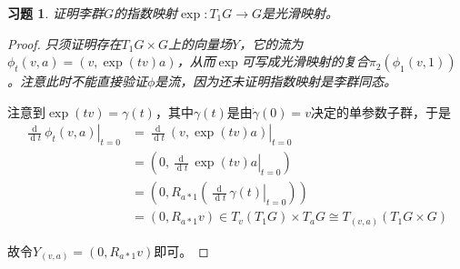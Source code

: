 \documentclass[winfonts,UTF8,c5size,a4paper,fancyhdr,hyperref,titlepage,nocap]{ctexart}
\newtheorem{xiti}{习题}
\theoremstyle{definition}
\theoremstyle{remark}
\numberwithin{equation}{subsection}
\newcommand{\dt}{\frac{\operatorname{d}}{\operatorname{d}t}}
\newcommand{\local}[2]{\left.{#1}\right|_{#2}}%
\newcommand{\localt}[1]{\local{#1}{t=0}}%
\begin{document}
\begin{xiti}
  证明李群$G$的指数映射$\exp\colon T_1G\to G$是光滑映射。
\end{xiti}
\begin{proof}
  \emph{只须证明存在$T_1G\times G$上的向量场$Y$，它的流为$\phi_t(v,a)=(v,\exp(tv)a)$，从而$\exp$可写成光滑映射的复合$\pi_2(\phi_1(v,1))$。注意此时不能直接验证$\phi$是流，因为还未证明指数映射是李群同态。}

  注意到$\exp(tv)=\gamma(t)$，其中$\gamma(t)$是由$\dot{\gamma}(0)=v$决定的单参数子群，于是
  \begin{align*}
    \localt{\dt\phi_t(v,a)}&=\localt{\dt(v,\exp(tv)a)}\\
                                   &=(0,\localt{\dt\exp(tv)a})\\
                                   &=(0,R_{a\ast1}(\localt{\dt\gamma(t)}))\\
                                   &=(0,R_{a\ast1}v)\in T_v(T_1G)\times T_aG\cong T_{(v,a)}(T_1G\times G)
  \end{align*}

  故令$Y_{(v,a)}=(0,R_{a\ast1}v)$即可。
\end{proof}
\end{document}
